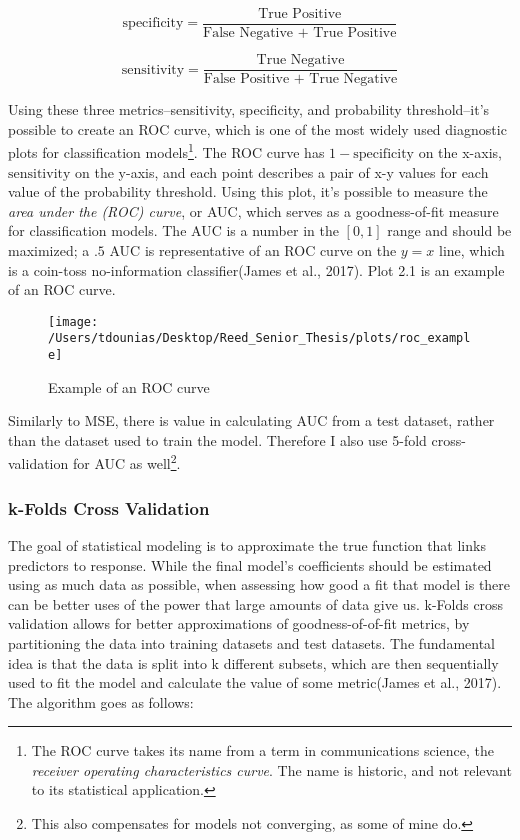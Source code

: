 \documentclass[12pt,twoside]{reedthesis}
\begin{document}
  \[\text{specificity} = \frac{\text{True Positive}}{\text{False Negative + True Positive}}\]
  
  \[\text{sensitivity} = \frac{\text{True Negative}}{\text{False Positive + True Negative}}\]
  
  Using these three metrics--sensitivity, specificity, and probability
  threshold--it's possible to create an ROC curve, which is one of the
  most widely used diagnostic plots for classification models\footnote{The
    ROC curve takes its name from a term in communications science, the
    \emph{receiver operating characteristics curve}. The name is historic,
    and not relevant to its statistical application.}. The ROC curve has
  \(1-\text{specificity}\) on the x-axis, \(\text{sensitivity}\) on the
  y-axis, and each point describes a pair of x-y values for each value of
  the probability threshold. Using this plot, it's possible to measure the
  \emph{area under the (ROC) curve}, or AUC, which serves as a
  goodness-of-fit measure for classification models. The AUC is a number
  in the \([0,1]\) range and should be maximized; a \(.5\) AUC is
  representative of an ROC curve on the \(y = x\) line, which is a
  coin-toss no-information classifier(James et al., 2017). Plot 2.1 is an
  example of an ROC curve.
  
  \begin{figure}
  
  {\centering \texttt{[image: /Users/tdounias/Desktop/Reed\_Senior\_Thesis/plots/roc\_example]} 
  
  }
  
  \caption[Example of an ROC curve]{Example of an ROC curve}\label{fig:roc example}
  \end{figure}
  
  Similarly to MSE, there is value in calculating AUC from a test dataset,
  rather than the dataset used to train the model. Therefore I also use
  5-fold cross-validation for AUC as well\footnote{This also compensates
    for models not converging, as some of mine do.}.
  
  \subsubsection{k-Folds Cross Validation}\label{k-folds-cross-validation}
  
  The goal of statistical modeling is to approximate the true function
  that links predictors to response. While the final model's coefficients
  should be estimated using as much data as possible, when assessing how
  good a fit that model is there can be better uses of the power that
  large amounts of data give us. k-Folds cross validation allows for
  better approximations of goodness-of-of-fit metrics, by partitioning the
  data into training datasets and test datasets. The fundamental idea is
  that the data is split into k different subsets, which are then
  sequentially used to fit the model and calculate the value of some
  metric(James et al., 2017). The algorithm goes as follows:
  
\end{document}
